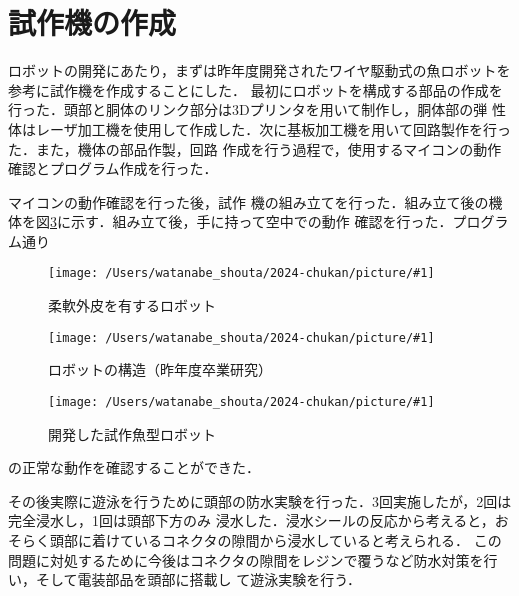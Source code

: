 \documentclass{jarticle}
\newcommand{\setPicture}[1]{\texttt{[image: /Users/watanabe\_shouta/2024-chukan/picture/\#1]}}
\begin{document}
\section{試作機の作成}
ロボットの開発にあたり，まずは昨年度開発されたワイヤ駆動式の魚ロボットを参考に試作機を作成することにした．
最初にロボットを構成する部品の作成を行った．頭部と胴体のリンク部分は3Dプリンタを用いて制作し，胴体部の弾
性体はレーザ加工機を使用して作成した．次に基板加工機を用いて回路製作を行った．また，機体の部品作製，回路
作成を行う過程で，使用するマイコンの動作確認とプログラム作成を行った．

マイコンの動作確認を行った後，試作
機の組み立てを行った．組み立て後の機体を図\ref{fig:fish-type}に示す．組み立て後，手に持って空中での動作
確認を行った．プログラム通り
\newpage

\begin{figure}[H]
   \centering
   \setPicture{fish-torso.jpg}
   \vspace*{-4mm}
   \caption{柔軟外皮を有するロボット\cite{ni}}
   \label{fig:bandable-Torso}
\end{figure}
\vspace{-4mm}
\begin{figure}[H]
   \centering
   \setPicture{tentativeschematic.png}
   \vspace*{-4mm}
   \caption{ロボットの構造（昨年度卒業研究）}
   \label{fig:structure}
\end{figure}
\vspace{-4mm}
\begin{figure}[H]
   \centering
   \setPicture{fish-copy.jpg}
   \vspace*{-4mm}
   \caption{開発した試作魚型ロボット}
   \label{fig:fish-type}
\end{figure}
\vspace{-4mm}

\noindent の正常な動作を確認することができた．%


その後実際に遊泳を行うために頭部の防水実験を行った．3回実施したが，2回は完全浸水し，1回は頭部下方のみ
浸水した．浸水シールの反応から考えると，おそらく頭部に着けているコネクタの隙間から浸水していると考えられる．
この問題に対処するために今後はコネクタの隙間をレジンで覆うなど防水対策を行い，そして電装部品を頭部に搭載し
て遊泳実験を行う．

\end{document}
